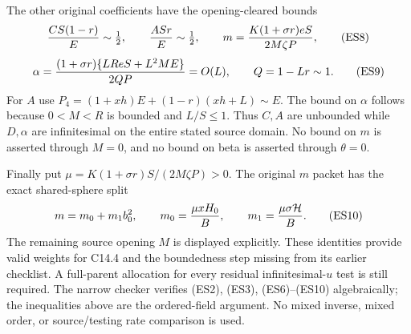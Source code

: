 The other original coefficients have the opening-cleared bounds
\[
 {CS(1-r)\over E}\sim\tfrac12,\qquad
 {ASr\over E}\sim\tfrac12,\qquad
 m={K(1+\sigma r)eS\over2M\zeta P},                  \tag{ES8}
\]
\[
 \alpha={(1+\sigma r)\{LR eS+L^2ME\}\over2QP}
       =O(L),\qquad Q=1-Lr\sim1.                   \tag{ES9}
\]
For $A$ use $P_4=(1+xh)E+(1-r)(xh+L)\sim E$.
The bound on $\alpha$ follows because $0<M<R$ is bounded and
$L/S\le1$. Thus $C,A$ are unbounded while $D,\alpha$ are
infinitesimal on the entire stated source domain. No bound on $m$
is asserted through $M=0$, and no bound on beta is asserted through
$\theta=0$.

Finally put $\mu=K(1+\sigma r)S/(2M\zeta P)>0$. The
original $m$ packet has the exact shared-sphere split
\[
 m=m_0+m_1b_0^2,\qquad
 m_0={\mu xH_0\over B},\qquad
 m_1={\mu\sigma\mathcal H\over B}.                  \tag{ES10}
\]
The remaining source opening $M$ is displayed explicitly. These
identities provide valid weights for C14.4 and the boundedness step
missing from its earlier checklist. A full-parent allocation for every
residual infinitesimal-$u$ test is still required. The narrow checker
verifies (ES2), (ES3), (ES6)--(ES10) algebraically; the inequalities
above are the ordered-field argument. No mixed inverse, mixed order,
or source/testing rate comparison is used.
